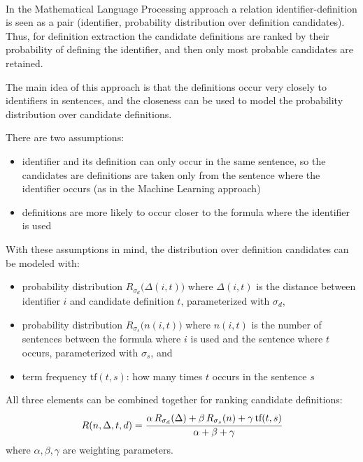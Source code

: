 \ \\

In the Mathematical Language Processing approach \cite{pagael2014mlp}
a relation identifier-definition is seen as a pair (identifier, 
probability distribution over definition candidates). Thus, for
definition extraction the candidate definitions are ranked by
their probability of defining the identifier, 
and then only most probable candidates are retained.

The main idea of this approach is that the definitions occur very closely 
to identifiers in sentences, and the closeness can be used to
model the probability distribution over candidate definitions. 

There are two assumptions:

\begin{itemize}
\itemsep1pt\parskip0pt
  \item identifier and its definition can only occur in the same sentence, 
      so the candidates are definitions are taken only from the sentence where 
      the identifier occurs (as in the Machine Learning approach)
  \item definitions are more likely to occur closer to the formula 
      where the identifier is used
\end{itemize}

With these assumptions in mind, the distribution over definition candidates 
can be modeled with:

\begin{itemize}
\itemsep1pt\parskip0pt
  \item probability distribution $R_{\sigma_d}\big(\Delta(i, t) \big)$ where $\Delta(i, t)$
        is the distance between identifier $i$ and candidate definition $t$, 
        parameterized with $\sigma_d$,
  \item probability distribution $R_{\sigma_s}\big(n(i, t) \big)$ where $n(i, t)$ 
        is the number of sentences between the formula where $i$ is used 
        and the sentence where $t$ occurs, 
        parameterized with $\sigma_s$,
        and
  \item term frequency $\text{tf}(t, s)$: how many times $t$ occurs in the sentence $s$
\end{itemize}


All three elements can be combined together for ranking candidate definitions:
$$R(n, \Delta, t, d) = \cfrac{\alpha \, R_{\sigma_d}(\Delta) + \beta \, R_{\sigma_s}(n) + \gamma \, \text{tf}(t, s)}{\alpha + \beta + \gamma}$$
where $\alpha, \beta, \gamma$ are weighting parameters.

